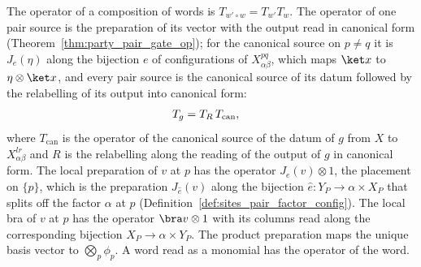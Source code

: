 \begin{theorem}
    \label{thm:party_word_op}
    \leanok
    The operator of a composition of words is $T_{w'\circ w}=T_{w'}T_w$. The operator of
    one pair source is the preparation of its vector with the output read in canonical
    form (Theorem~\ref{thm:party_pair_gate_op}); for the canonical source on $p\neq q$ it
    is $J_e(\eta)$ along the bijection $e$ of configurations of
    $X^{pq}_{\alpha\beta}$, which maps $\ket x$ to $\eta\otimes\ket x$, and every pair
    source is the canonical source of its datum followed by the relabelling of its
    output into canonical form:
    \begin{align}
        T_g & =T_{R}\,T_{\mathrm{can}}, \notag
    \end{align}
    where $T_{\mathrm{can}}$ is the operator of the canonical source of the datum of $g$
    from $X$ to $X^{lr}_{\alpha\beta}$ and $R$ is the relabelling along the reading of
    the output of $g$ in canonical form.
    The local preparation of $v$ at $p$ has the operator $J_e(v)\otimes1$, the
    placement on $\{p\}$, which is the preparation $J_{\hat e}(v)$ along the
    bijection $\hat e\colon Y_P\to\alpha\times X_P$ that splits off the factor $\alpha$
    at $p$ (Definition~\ref{def:sites_pair_factor_config}). The local bra of $v$ at $p$
    has the operator $\bra v\otimes1$ with its columns read along the corresponding
    bijection $X_P\to\alpha\times Y_P$. The product preparation maps the unique basis
    vector to $\bigotimes_p\phi_p$. A word read as a monomial has the operator of the
    word.
\end{theorem}
